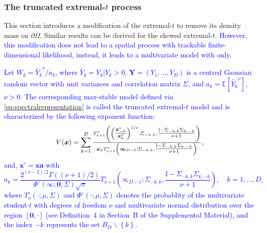\documentclass[12pt]{article}
\newcommand{\PZ}{\textcolor{blue}}
\begin{document}
\subsubsection{The truncated extremal-$t$ process}

This section introduces a modification of the  extremal-$t$ to remove its density mass on $\partial\Omega$. Similar results can be derived for the skewed extremal-$t$. 
\PZ{However, this modification does not lead to a spatial process with trackable finite-dimensional likelihood, instead, it leads to a multivariate model with only.}      
\begin{theorem}
\label{thm:truncated_extremal_t}   
\PZ{Let $W_k = \tilde{Y_k}^\nu / a_k$, where $\tilde{Y_k} = Y_k|Y_k >0$, $\bm Y = (Y_1,\dots,Y_D)$ is a centred Gaussian random vector with unit variances and correlation matrix $\Sigma$, and $a_k = \mathbb{E}\left[ \tilde{Y_k}^\nu\right]$, $\nu>0$.
The corresponding max-stable model defined via \eqref{eq:spectralrepresentation} is called the truncated extremal-$t$ model and is characterized by the following exponent function:
%
\begin{equation}
\label{eq:V_tet}
V({\boldsymbol{x}}) = \sum_{k=1}^D {\textstyle{T_{\nu+1}^\circ\left( \left({\textstyle{\bm x_{-k}^\circ\over\bm x_{k}^\circ}}\right)^{1/\nu} ;\Sigma_{-k,k},{\textstyle{\mathbb{I}-\Sigma_{-k,k}\Sigma_{k,-k} \over\nu+1}}\right)\over\bm x_k T_{\nu+1}^\circ\left(\bm \infty_{D-1};\Sigma_{-k,k}, {\textstyle{\mathbb{I}-\Sigma_{-k,k} \Sigma_{k,-k}\over\nu+1}}\right)}},
\end{equation}
%
and, $\bm x^\circ = \bm x \bm a$ with
\begin{equation*}
a_k = \frac{2^{(\nu-2)/2}\Gamma((\nu+1)/2)}{\Phi^\circ(\bm \infty;\bm 0, \Sigma) \sqrt{\pi}} T_{\nu+1}^\circ\left(
\bm \infty_{D-1};
\Sigma_{-k,k}, \frac{\mathbb{I} -\Sigma_{-k,k} \Sigma_{k,-k}}{\nu+1} \right), \quad k=1,\dots,D,	    
\end{equation*}
where $T_{\nu}^\circ(\cdot; \mu, \Sigma)$ and $\Phi^\circ(\cdot; \mu, \Sigma)$ denotes the probablity of the multivariate student-$t$ with degrees of freedom $\nu$ and multivariate normal distribution over the region $[\bm 0,\cdot]$ (see Definition~4 in Section~B of the Supplemental Material), and the index $-k$ represents the set $B_D \backslash \left\{ k\right\}$.}
%
\end{theorem}
\end{document}
